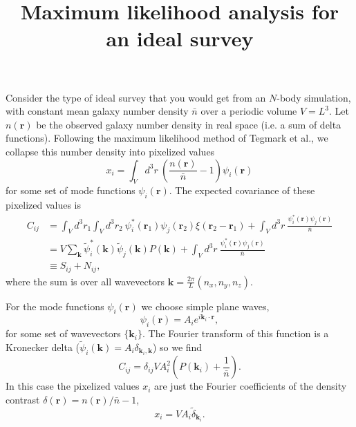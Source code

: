 \documentclass{article}
\title{Maximum likelihood analysis for an ideal survey}
\renewcommand{\vec}[1]{\bm{#1}}
\newcommand{\nbar}{\bar{n}}
\begin{document}
\maketitle

Consider the type of ideal survey that you would get from an $N$-body
simulation, with constant mean galaxy number density $\nbar$ over a periodic
volume $V = L^3$.  Let $n(\vec{r})$ be the observed galaxy number density in
real space (i.e. a sum of delta functions).  Following the maximum likelihood
method of Tegmark et al., we collapse this number density into pixelized values
\begin{equation}
    x_i = \int_V d^3r~ \left(\frac{n(\vec{r})}{\nbar} - 1\right) \psi_i(\vec{r})
\end{equation}
for some set of mode functions $\psi_i(\vec{r})$.  The expected covariance of
these pixelized values is
\begin{align}
    C_{ij} &= \int_V d^3r_1 \int_V d^3r_2~ \psi_i^*(\vec{r}_1) \psi_j(\vec{r}_2) \xi(\vec{r}_2 - \vec{r}_1) + \int_V d^3r~ \frac{\psi_i^*(\vec{r}) \psi_j(\vec{r})}{\nbar} \\
           &= V \sum_{\vec{k}} \tilde{\psi}_i^*(\vec{k}) \tilde{\psi}_j(\vec{k}) P(\vec{k}) + \int_V d^3r~ \frac{\psi_i^*(\vec{r}) \psi_j(\vec{r})}{\nbar} \\
           &\equiv S_{ij} + N_{ij} ,
\end{align}
where the sum is over all wavevectors $\vec{k} = \frac{2\pi}{L} (n_x, n_y, n_z)$.

For the mode functions $\psi_i(\vec{r})$ we choose simple plane waves,
\begin{equation}
    \psi_i(\vec{r}) = A_i e^{i\vec{k}_i \cdot \vec{r}},
\end{equation}
for some set of wavevectors $\{ \vec{k}_i \}$.  The Fourier transform of this
function is a Kronecker delta
($\tilde{\psi}_i(\vec{k}) = A_i \delta_{\vec{k}_i, \vec{k}}$) so we find
\begin{equation}
    C_{ij} = \delta_{ij} V A_i^2 \left( P(\vec{k}_i) + \frac{1}{\nbar} \right).
\end{equation}
In this case the pixelized values $x_i$ are just the Fourier coefficients of
the density contrast $\delta(\vec{r}) = n(\vec{r})/\nbar - 1$,
\begin{equation}
    x_i = V A_i \tilde{\delta}_{\vec{k}_i} .
\end{equation}
\end{document}

